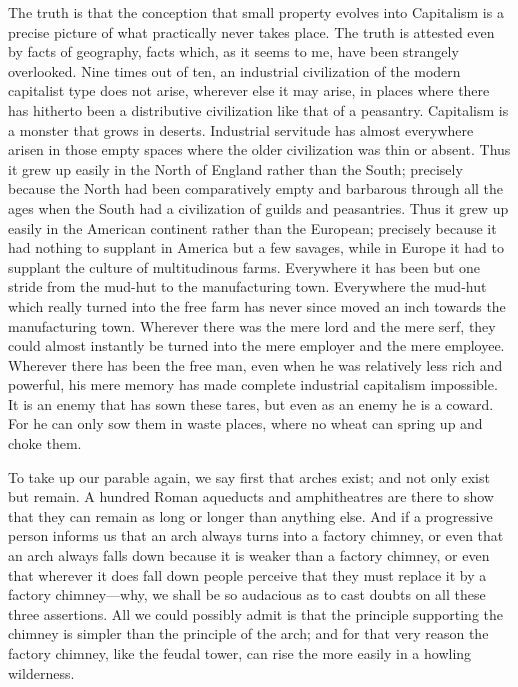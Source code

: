 \documentclass{book}
\begin{document}
The truth is that the conception that small property evolves into Capitalism is a precise picture of what practically never takes place. The truth is attested even by facts of geography, facts which, as it seems to me, have been strangely overlooked. Nine times out of ten, an industrial civilization of the modern capitalist type does not arise, wherever else it may arise, in places where there has hitherto been a distributive civilization like that of a peasantry. Capitalism is a monster that grows in deserts. Industrial servitude has almost everywhere arisen in those empty spaces where the older civilization was thin or absent. Thus it grew up easily in the North of England rather than the South; precisely because the North had been comparatively empty and barbarous through all the ages when the South had a civilization of guilds and peasantries. Thus it grew up easily in the American continent rather than the European; precisely because it had nothing to supplant in America but a few savages, while in Europe it had to supplant the culture of multitudinous farms. Everywhere it has been but one stride from the mud-hut to the manufacturing town. Everywhere the mud-hut which really turned into the free farm has never since moved an inch towards the manufacturing town. Wherever there was the mere lord and the mere serf, they could almost instantly be turned into the mere employer and the mere employee. Wherever there has been the free man, even when he was relatively less rich and powerful, his mere memory has made complete industrial capitalism impossible. It is an enemy that has sown these tares, but even as an enemy he is a coward. For he can only sow them in waste places, where no wheat can spring up and choke them.

To take up our parable again, we say first that arches exist; and not only exist but remain. A hundred Roman aqueducts and amphitheatres are there to show that they can remain as long or longer than anything else. And if a progressive person informs us that an arch always turns into a factory chimney, or even that an arch always falls down because it is weaker than a factory chimney, or even that wherever it does fall down people perceive that they must replace it by a factory chimney—why, we shall be so audacious as to cast doubts on all these three assertions. All we could possibly admit is that the principle supporting the chimney is simpler than the principle of the arch; and for that very reason the factory chimney, like the feudal tower, can rise the more easily in a howling wilderness.
\end{document}
